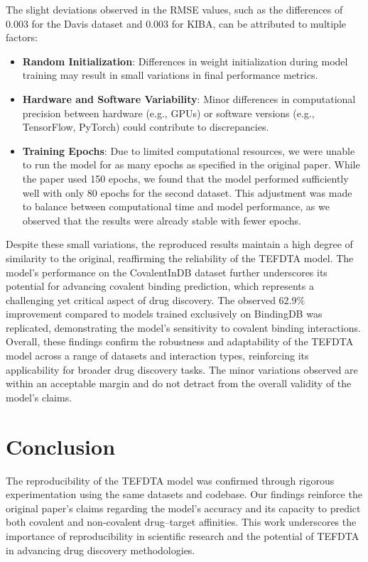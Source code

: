 \documentclass{article}
\begin{document}
The slight deviations observed in the RMSE values, such as the differences of 0.003 for the Davis dataset and 0.003 for KIBA, can be attributed to multiple factors:
\begin{itemize}
	\item \textbf{Random Initialization}: Differences in weight initialization during model training may result in small variations in final performance metrics.
	\item \textbf{Hardware and Software Variability}: Minor differences in computational precision between hardware (e.g., GPUs) or software versions (e.g., TensorFlow, PyTorch) could contribute to discrepancies.
	\item \textbf{Training Epochs}: Due to limited computational resources, we were unable to run the model for as many epochs as specified in the original paper. While the paper used 150 epochs, we found that the model performed sufficiently well with only 80 epochs for the second dataset. This adjustment was made to balance between computational time and model performance, as we observed that the results were already stable with fewer epochs.
\end{itemize}

Despite these small variations, the reproduced results maintain a high degree of similarity to the original, reaffirming the reliability of the TEFDTA model. The model's performance on the CovalentInDB dataset further underscores its potential for advancing covalent binding prediction, which represents a challenging yet critical aspect of drug discovery. The observed 62.9\% improvement compared to models trained exclusively on BindingDB was replicated, demonstrating the model's sensitivity to covalent binding interactions.\\

Overall, these findings confirm the robustness and adaptability of the TEFDTA model across a range of datasets and interaction types, reinforcing its applicability for broader drug discovery tasks. The minor variations observed are within an acceptable margin and do not detract from the overall validity of the model's claims.

\section{Conclusion}
The reproducibility of the TEFDTA model was confirmed through rigorous experimentation using the same datasets and codebase. Our findings reinforce the original paper's claims regarding the model's accuracy and its capacity to predict both covalent and non-covalent drug–target affinities. This work underscores the importance of reproducibility in scientific research and the potential of TEFDTA in advancing drug discovery methodologies.


\end{document}
